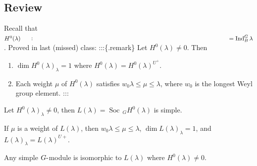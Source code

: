 \hypertarget{review-1}{%
\subsection{Review}\label{review-1}}

Recall that
\(H^0(\lambda) \mathrel{\vcenter{:}}=\operatorname{Ind}_B^G \lambda\).
Proved in last (missed) class: :::\{.remark\} Let
\(H^0(\lambda) \neq 0\). Then

\begin{enumerate}
\def\labelenumi{\alph{enumi}.}
\item
  \(\dim H^0(\lambda)_\lambda = 1\) where
  \(H^0(\lambda) = H^0(\lambda)^{U^+}\).
\item
  Each weight \(\mu\) of \(H^0(\lambda)\) satisfies
  \(w_0 \lambda \leq \mu \leq \lambda\), where \(w_0\) is the longest
  Weyl group element. :::
\end{enumerate}

\begin{remark}

\begin{remark}

Let \(H^0(\lambda)_\lambda \neq 0\), then
\(L(\lambda) = \operatorname{Soc}\,_G H^0(\lambda)\) is simple.

\end{remark}

\end{remark}

\begin{remark}

\begin{remark}

If \(\mu\) is a weight of \(L(\lambda)\), then
\(w_0 \lambda \leq \mu \leq \lambda\), \(\dim L(\lambda)_\lambda = 1\),
and \(L(\lambda)_\lambda = L(\lambda)^{U+}\).

\end{remark}

\end{remark}

\begin{remark}

\begin{remark}

Any simple \(G{\hbox{-}}\)module is isomorphic to \(L(\lambda)\) where
\(H^0(\lambda) \neq 0\).

\end{remark}

\end{remark}

